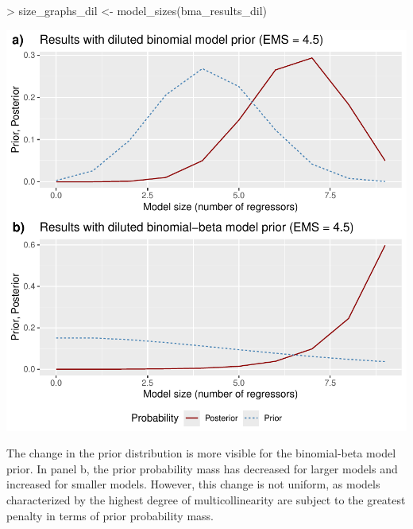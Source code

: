 \documentclass[a4paper]{article}
\begin{document}
\begin{Schunk}
\begin{Sinput}
> size_graphs_dil <- model_sizes(bma_results_dil)
\end{Sinput}
\end{Schunk}
\includegraphics{bdsm_vignette-040}

The change in the prior distribution is more visible for the binomial-beta model prior.
In panel b, the prior probability mass has decreased for larger models and increased for smaller models.
However, this change is not uniform, as models characterized by the highest degree of multicollinearity are subject to the greatest penalty in terms of prior probability mass.
\end{document}
